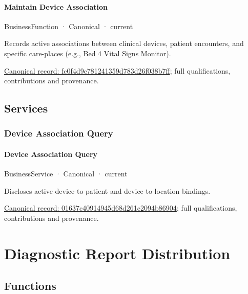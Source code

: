 \paragraph{Maintain Device Association}

\label{element:fc0f4d9c781241359d783d26f038b7ff}
{\small BusinessFunction · Canonical · current}\par

Records active associations between clinical devices, patient encounters, and specific care-places (e.g., Bed 4 Vital Signs Monitor).


{\footnotesize \href{../../../../continuum/business/business-function/fc0f4d9c781241359d783d26f038b7ff.md}{Canonical record: fc0f4d9c781241359d783d26f038b7ff}; full qualifications, contributions and provenance.}\par
\subsection{Services}

\subsubsection{Device Association Query}

\paragraph{Device Association Query}

\label{element:01637c40914945d68d261c2094b86904}
{\small BusinessService · Canonical · current}\par

Discloses active device-to-patient and device-to-location bindings.


{\footnotesize \href{../../../../continuum/business/business-service/01637c40914945d68d261c2094b86904.md}{Canonical record: 01637c40914945d68d261c2094b86904}; full qualifications, contributions and provenance.}\par
\section{Diagnostic Report Distribution}

\subsection{Functions}

